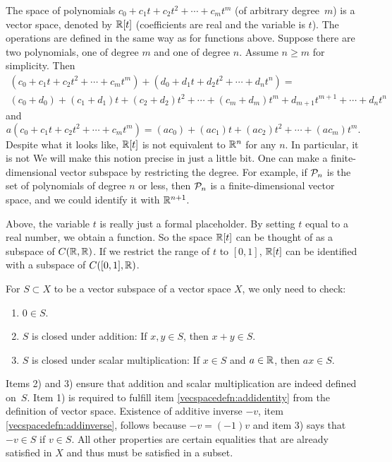 \begin{example}
The space of polynomials $c_0 + c_1 t + c_2 t^2 + \cdots + c_m t^m$
(of arbitrary degree~$m$) is a vector space,
denoted by ${\mathbb{R}}[t]$ (coefficients are real and
the variable is $t$).  The operations are defined in the same way as for
functions above.
Suppose there are
two polynomials, one of degree $m$ and one of degree $n$.  Assume $n
\geq m$ for simplicity.  Then
\begin{multline*}
(c_0 + c_1 t + c_2 t^2 + \cdots + c_m t^m)
+
(d_0 + d_1 t + d_2 t^2 + \cdots + d_n t^n)
= \\
(c_0+d_0) + (c_1+d_1) t + (c_2 + d_2) t^2 + \cdots + (c_m+d_m) t^m
+ d_{m+1} t^{m+1} + \cdots + d_n t^n
\end{multline*}
and
\begin{equation*}
a(c_0 + c_1 t + c_2 t^2 + \cdots + c_m t^m)
=
(ac_0) + (ac_1) t + (ac_2) t^2 + \cdots + (ac_m) t^m  .
\end{equation*}
Despite what it looks like, ${\mathbb{R}}[t]$ is not equivalent to ${\mathbb{R}}^n$ for any $n$.  In
particular, it is not   We will make this notion
precise in just a little bit.  One can make a
finite-dimensional vector subspace by restricting the degree.  For example,
if ${\mathcal{P}}_n$ is the set of polynomials of degree $n$ or less,
then ${\mathcal{P}}_n$ is a finite-dimensional vector space, and we could 
identify it with ${\mathbb{R}}^{n+1}$.

Above, the variable $t$ is really just a formal placeholder.
By setting $t$ equal to a real number, we obtain a function.
So the space ${\mathbb{R}}[t]$ can be thought of as a subspace of $C({\mathbb{R}},{\mathbb{R}})$.
If we restrict the range of $t$ to $[0,1]$, ${\mathbb{R}}[t]$ can be identified with
a subspace of $C([0,1],{\mathbb{R}})$.
\end{example}

\begin{remark}
For $S \subset X$ to be a vector subspace
of a vector space $X$, we only need to check:
\begin{enumerate}[1)]
\item
$0 \in S$.
\item
$S$ is closed under addition: If $x,y \in S$, then $x+y \in S$.
\item
$S$ is closed under scalar multiplication:
If $x \in S$ and $a \in {\mathbb{R}}$, then $ax \in S$.
\end{enumerate}
Items 2) and 3)
ensure that addition and scalar multiplication are indeed defined on~$S$.
Item 1) is required
to fulfill item \ref{vecspacedefn:addidentity} from the definition of vector
space.  Existence
of additive inverse $-v$, item \ref{vecspacedefn:addinverse},
follows because $-v = (-1)v$ and item 3) says that
$-v \in S$ if $v \in S$.  All other properties are certain equalities
that are already satisfied in $X$ and thus must be satisfied in a subset.
\end{remark}

